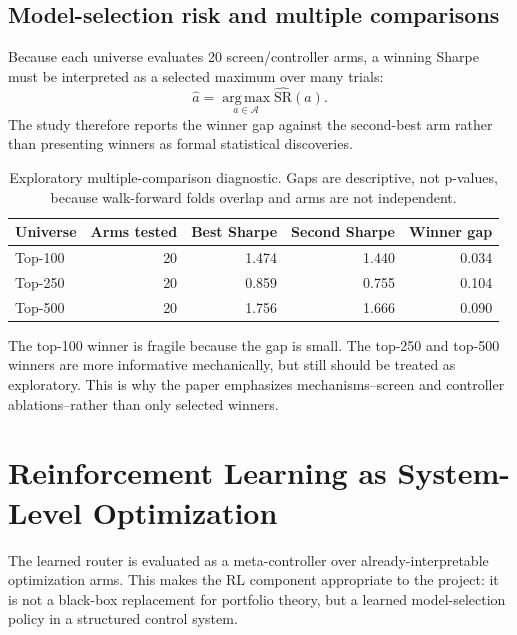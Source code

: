 \documentclass[11pt,a4paper]{article}
\newcommand{\argmax}{\operatorname*{arg\,max}}
\begin{document}
\subsection{Model-selection risk and multiple comparisons}
Because each universe evaluates 20 screen/controller arms, a winning Sharpe must be interpreted as a selected maximum over many trials:
\begin{equation}
\widehat{a} = \argmax_{a\in\mathcal{A}} \widehat{\text{SR}}(a).
\end{equation}
The study therefore reports the winner gap against the second-best arm rather than presenting winners as formal statistical discoveries.
\begin{table}[H]
\centering
\caption{Exploratory multiple-comparison diagnostic. Gaps are descriptive, not p-values, because walk-forward folds overlap and arms are not independent.}
\label{tab:selection_risk_math}
\small
\begin{tabular}{lrrrr}
\toprule
Universe & Arms tested & Best Sharpe & Second Sharpe & Winner gap\\
\midrule
Top-100 & 20 & 1.474 & 1.440 & 0.034\\
Top-250 & 20 & 0.859 & 0.755 & 0.104\\
Top-500 & 20 & 1.756 & 1.666 & 0.090\\
\bottomrule
\end{tabular}
\end{table}
The top-100 winner is fragile because the gap is small. The top-250 and top-500 winners are more informative mechanically, but still should be treated as exploratory. This is why the paper emphasizes mechanisms--screen and controller ablations--rather than only selected winners.

\section{Reinforcement Learning as System-Level Optimization}
The learned router is evaluated as a meta-controller over already-interpretable optimization arms. This makes the RL component appropriate to the project: it is not a black-box replacement for portfolio theory, but a learned model-selection policy in a structured control system.
\end{document}
